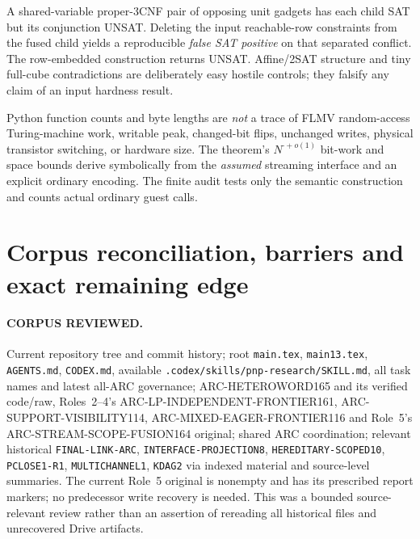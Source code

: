 \documentclass[11pt]{article}
\begin{document}
A shared-variable proper-3CNF pair of opposing unit gadgets has each
child SAT but its conjunction UNSAT.  Deleting the input reachable-row
constraints from the fused child yields a reproducible \emph{false
SAT positive} on that separated conflict. The row-embedded
construction returns UNSAT.  Affine/2SAT structure and tiny
full-cube contradictions are deliberately easy hostile controls;
they falsify any claim of an input hardness result.

Python function counts and byte lengths are \emph{not} a trace of
FLMV random-access Turing-machine work, writable peak, changed-bit
flips, unchanged writes, physical transistor switching, or hardware
size.  The theorem's $N^{\cdot+o(1)}$ bit-work and space bounds derive
symbolically from the \emph{assumed} streaming interface and an explicit
ordinary encoding.  The finite audit tests only the semantic
construction and counts actual ordinary guest calls.

\section{Corpus reconciliation, barriers and exact remaining edge}
\paragraph{CORPUS REVIEWED.}
Current repository tree and commit history; root \texttt{main.tex},
\texttt{main13.tex}, \texttt{AGENTS.md}, \texttt{CODEX.md}, available
\texttt{.codex/skills/pnp-research/SKILL.md}, all task names and
latest all-ARC governance; ARC-HETEROWORD165 and its verified code/raw,
Roles~2--4's ARC-LP-INDEPENDENT-FRONTIER161,
ARC-SUPPORT-VISIBILITY114, ARC-MIXED-EAGER-FRONTIER116 and
Role~5's ARC-STREAM-SCOPE-FUSION164 original; shared ARC coordination;
relevant historical \texttt{FINAL-LINK-ARC},
\texttt{INTERFACE-PROJECTION8}, \texttt{HEREDITARY-SCOPED10},
\texttt{PCLOSE1-R1}, \texttt{MULTICHANNEL1}, \texttt{KDAG2} via
indexed material and source-level summaries.  The current Role~5
original is nonempty and has its prescribed report markers; no
predecessor write recovery is needed.  This was a bounded
source-relevant review rather than an assertion of rereading all
historical files and unrecovered Drive artifacts.
\end{document}
